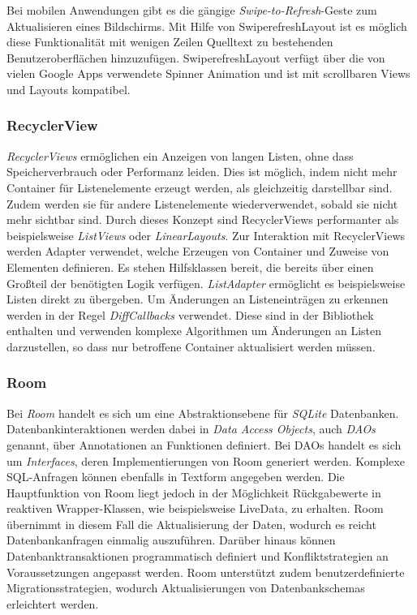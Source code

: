 Bei mobilen Anwendungen gibt es die gängige \textit{Swipe-to-Refresh}-Geste zum Aktualisieren eines Bildschirms.
Mit Hilfe von SwiperefreshLayout ist es möglich diese Funktionalität mit wenigen Zeilen Quelltext zu bestehenden Benutzeroberflächen hinzuzufügen.
SwiperefreshLayout verfügt über die von vielen Google Apps verwendete Spinner Animation und ist mit scrollbaren Views und Layouts kompatibel.

\subsubsection{RecyclerView}
\label{subsubsec:app:jetpack:recyclerview}
\textit{RecyclerViews} ermöglichen ein Anzeigen von langen Listen, ohne dass Speicherverbrauch oder Performanz leiden.
Dies ist möglich, indem nicht mehr Container für Listenelemente erzeugt werden, als gleichzeitig darstellbar sind. 
Zudem werden sie für andere Listenelemente wiederverwendet, sobald sie nicht mehr sichtbar sind.
Durch dieses Konzept sind RecyclerViews performanter als beispielsweise \textit{ListViews} oder \textit{LinearLayouts}.
Zur Interaktion mit RecyclerViews werden Adapter verwendet, welche Erzeugen von Container und Zuweise von Elementen definieren.
Es stehen Hilfsklassen bereit, die bereits über einen Großteil der benötigten Logik verfügen.
\textit{ListAdapter} ermöglicht es beispielsweise Listen direkt zu übergeben.
Um Änderungen an Listeneinträgen zu erkennen werden in der Regel \textit{DiffCallbacks} verwendet.
Diese sind in der Bibliothek enthalten und verwenden komplexe Algorithmen um Änderungen an Listen darzustellen, so dass nur betroffene Container aktualisiert werden müssen.

\subsubsection{Room}
\label{subsubsec:app:jetpack:room}
Bei \textit{Room} handelt es sich um eine Abstraktionsebene für \textit{SQLite} Datenbanken.
Datenbankinteraktionen werden dabei in \textit{Data Access Objects}, auch \textit{DAOs} genannt, über Annotationen an Funktionen definiert.
Bei DAOs handelt es sich um \textit{Interfaces}, deren Implementierungen von Room generiert werden.
Komplexe SQL-Anfragen können ebenfalls in Textform angegeben werden.
Die Hauptfunktion von Room liegt jedoch in der Möglichkeit Rückgabewerte in reaktiven Wrapper-Klassen, wie beispielsweise LiveData, zu erhalten.
Room übernimmt in diesem Fall die Aktualisierung der Daten, wodurch es reicht Datenbankanfragen einmalig auszuführen.
Darüber hinaus können Datenbanktransaktionen programmatisch definiert und Konfliktstrategien an Voraussetzungen angepasst werden.
Room unterstützt zudem benutzerdefinierte Migrationsstrategien, wodurch Aktualisierungen von Datenbankschemas erleichtert werden.

